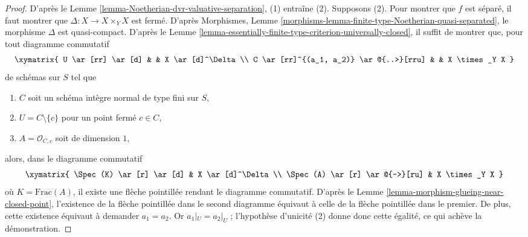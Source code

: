 \begin{proof}
D'après le Lemme \ref{lemma-Noetherian-dvr-valuative-separation},
(1) entraîne (2). Supposons (2). Pour montrer que $f$ est séparé,
il faut montrer que $\Delta : X \to X \times_Y X$ est fermé. D'après
Morphismes, Lemme \ref{morphisms-lemma-finite-type-Noetherian-quasi-separated},
le morphisme $\Delta$ est quasi-compact.
D'après le Lemme \ref{lemma-essentially-finite-type-criterion-universally-closed},
il suffit de montrer que, pour tout diagramme commutatif
$$
\xymatrix{
U \ar[rr] \ar[d] & & X \ar[d]^\Delta \\
C \ar[rr]^{(a_1, a_2)} \ar@{..>}[rru] & & X \times_Y X
}
$$
de schémas sur $S$ tel que
\begin{enumerate}
\item $C$ soit un schéma intègre normal de type fini sur $S$,
\item $U = C \setminus \{c\}$ pour un point fermé $c \in C$,
\item $A = \mathcal{O}_{C, c}$ soit de dimension $1$,
\end{enumerate}
alors, dans le diagramme commutatif
$$
\xymatrix{
\Spec(K) \ar[r] \ar[d] & X \ar[d]^\Delta \\
\Spec(A) \ar[r] \ar@{-->}[ru] & X \times_Y X
}
$$
où $K = \text{Frac}(A)$, il existe une flèche pointillée
rendant le diagramme commutatif. D'après le
Lemme \ref{lemma-morphism-glueing-near-closed-point},
l'existence de la flèche pointillée dans le second diagramme
équivaut à celle de la flèche pointillée
dans le premier. De plus, cette existence
équivaut à demander $a_1 = a_2$. Or $a_1|_U = a_2|_U$ ;
l'hypothèse d'unicité (2) donne donc cette égalité,
ce qui achève la démonstration.
\end{proof}

